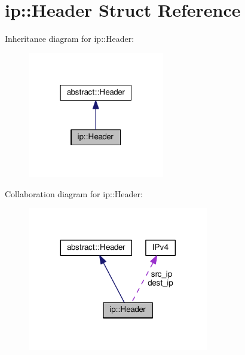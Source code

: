 \hypertarget{structip_1_1Header}{}\section{ip\+:\+:Header Struct Reference}
\label{structip_1_1Header}


Inheritance diagram for ip\+:\+:Header\+:
\nopagebreak
\begin{figure}[H]
\begin{center}
\leavevmode
\includegraphics[width=169pt]{structip_1_1Header__inherit__graph}
\end{center}
\end{figure}


Collaboration diagram for ip\+:\+:Header\+:
\nopagebreak
\begin{figure}[H]
\begin{center}
\leavevmode
\includegraphics[width=224pt]{structip_1_1Header__coll__graph}
\end{center}
\end{figure}
